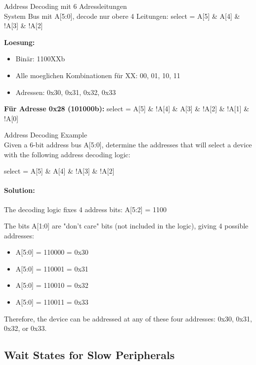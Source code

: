 \begin{example2}{Address Decoding mit 6 Adressleitungen}\\
    System Bus mit A[5:0], decode nur obere 4 Leitungen:
    select = A[5] \& A[4] \& !A[3] \& !A[2]
    
    \tcblower
    
    \textbf{Loesung:}
    \begin{itemize}
        \item Binär: 1100XXb
        \item Alle moeglichen Kombinationen für XX: 00, 01, 10, 11
        \item Adressen: 0x30, 0x31, 0x32, 0x33
    \end{itemize}
    
    \textbf{Für Adresse 0x28 (101000b):}
    select = A[5] \& !A[4] \& A[3] \& !A[2] \& !A[1] \& !A[0]
\end{example2}

\begin{example2}{Address Decoding Example}\\
Given a 6-bit address bus A[5:0], determine the addresses that will select a device with the following address decoding logic:
\begin{center}
select = A[5] \& A[4] \& !A[3] \& !A[2]
\end{center}

\tcblower
\paragraph{Solution:}
The decoding logic fixes 4 address bits: A[5:2] = 1100

The bits A[1:0] are "don't care" bits (not included in the logic), giving 4 possible addresses:
\begin{itemize}
    \item A[5:0] = 110000 = 0x30
    \item A[5:0] = 110001 = 0x31
    \item A[5:0] = 110010 = 0x32
    \item A[5:0] = 110011 = 0x33
\end{itemize}

Therefore, the device can be addressed at any of these four addresses: 0x30, 0x31, 0x32, or 0x33.
\end{example2}

\columnbreak

\subsection{Wait States for Slow Peripherals}

